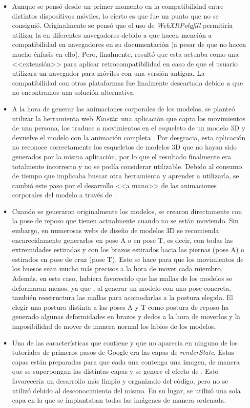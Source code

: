 \documentclass{subfiles}
\begin{document}
    \begin{itemize}
        \item Aunque se pensó desde un primer momento en la compatibilidad entre distintos dispositivos móviles, lo cierto es que fue un punto que no se consiguió. Originalmente se pensó que el uso de \textit{WebXRPolyfill} permitiría utilizar la \ra en diferentes navegadores debido a que hacen mención a compatibilidad en navegadores en su documentación \cite{web:webxrpolyfill} (a pesar de que no hacen mucho énfasis en ello). Pero, finalmente, resultó que esta actuaba como una <<extensión>> para aplicar retrocompatibilidad en caso de que el usuario utilizara un navegador \googlechrome para móviles con una versión antigua. La compatibilidad con otras plataformas fue finalmente descartada debido a que no encontramos una solución alternativa.
        \item A la hora de generar las animaciones corporales de los modelos, se planteó utilizar la herramienta web \textit{Kinetix}: una aplicación que capta los movimientos de una persona, los traduce a movimientos en el esqueleto de un modelo 3D y devuelve el modelo con la animación completa \cite{web:kinetix}. Por desgracia, esta aplicación no reconoce correctamente los esqueletos de modelos 3D que no hayan sido generados por la misma aplicación, por lo que el resultado finalmente era totalmente incorrecto y no se podía considerar utilizable. Debido al consumo de tiempo que implicaba buscar otra herramienta y aprender a utilizarla, se cambió este paso por el desarrollo <<a mano>> de las animaciones corporales del modelo a través de \blender.
        \item Cuando se generaron originalmente los modelos, se crearon directamente con la pose de reposo que tienen actualmente cuando no se están moviendo. Sin embargo, en numerosas webs de diseño de modelos 3D se recomienda encarecidamente generarlos en pose A o en pose T, es decir, con todas las extremidades estiradas y con los brazos estirados hacia las piernas (pose A) o estirados en pose de cruz (pose T). Esto se hace para que los movimientos de los huesos sean mucho más precisos a la hora de mover cada miembro. Además, en este caso, hubiera favorecido que las mallas de los modelos se deformaran menos, ya que \makehuman, al generar un modelo con una pose concreta, también reestructura las mallas para acomodarlas a la postura elegida. El elegir una postura distinta a las poses A y T como postura de reposo ha generado algunas deformidades en brazos y dedos a la hora de moverlos y la imposibilidad de mover de manera normal los labios de los modelos.
        \item Una de las características que contiene \webxr y que no aparecía en ninguno de los tutoriales de primeros pasos de Google era las capas de \textit{renderState}. Estas capas están preparadas para que cada una contenga una imagen, de manera que se superpongan las distintas capas y se genere el efecto de \ra. Esto favorecería un desarrollo más limpio y organizado del código, pero no se utilizó debido al desconocimiento del mismo. En su lugar, se utilizó una sola capa en la que se implantaban todas las imágenes de manera ordenada.
    \end{itemize}
\end{document}

